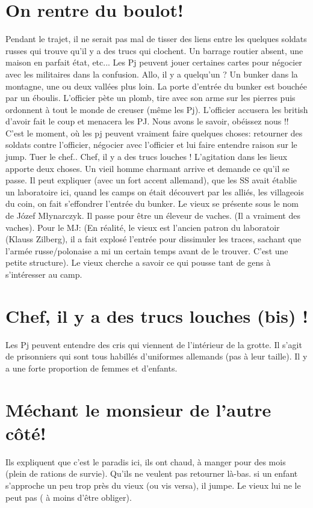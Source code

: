 \documentclass[oneside,12pt]{book}
\begin{document}
\begin{flushleft}
\section{On rentre du boulot!}
Pendant le trajet, il ne serait pas mal de tisser des liens entre les quelques soldats russes qui trouve qu’il y a des trucs qui clochent.  
Un barrage routier absent, une maison en parfait état, etc...
Les Pj peuvent jouer certaines cartes pour négocier avec les militaires dans la confusion.
Allo, il y a quelqu’un ?
Un bunker dans la montagne, une ou deux vallées plus loin.
La porte d’entrée du bunker est bouchée par un éboulis.
L’officier pète un plomb, tire avec son arme sur les pierres puis ordonnent à tout le monde de creuser (même les Pj). L’officier accusera les british d’avoir fait le coup et menacera les PJ.
Nous avons le savoir, obéissez nous !!
C’est le moment, où les pj peuvent vraiment faire quelques choses: retourner des soldats contre l’officier, négocier avec l’officier et lui faire entendre raison sur le jump.  Tuer le chef..
Chef, il y a des trucs louches !
L’agitation dans les lieux apporte deux choses. Un vieil homme charmant arrive et demande ce qu’il se passe. 
Il peut expliquer (avec un fort accent allemand), que les SS avait établie un laboratoire ici, quand les camps on était découvert par les alliés, les villageois du coin, on fait s’effondrer l’entrée du bunker. 
Le vieux se présente sous le nom de Józef Młynarczyk. Il passe pour être un éleveur de vaches. (Il a vraiment des vaches).  
Pour le MJ:
(En réalité, le vieux est l’ancien patron du laboratoir (Klauss Zilberg), il a fait explosé l’entrée pour dissimuler les traces, sachant que l’armée russe/polonaise a mi un certain temps avant de le trouver. 
C’est une petite structure).
Le vieux cherche a savoir ce qui pousse tant de gens à s’intéresser au camp.

\section{Chef, il y a des trucs louches (bis) !}
Les Pj peuvent entendre des cris qui viennent de l’intérieur de la grotte.
Il s’agit de prisonniers qui sont tous habillés d’uniformes allemands (pas à leur taille). Il y a une forte proportion de femmes et d’enfants.
\section{Méchant le monsieur de l’autre côté!}
Ils expliquent que c’est le paradis ici, ils ont chaud, à manger pour des mois (plein de rations de survie). Qu’ils ne veulent pas retourner là-bas.
si un enfant s’approche un peu trop près du vieux (ou vis versa), il jumpe. Le vieux lui ne le peut pas ( à moins d’être obliger).


\end{flushleft}
\end{document}
